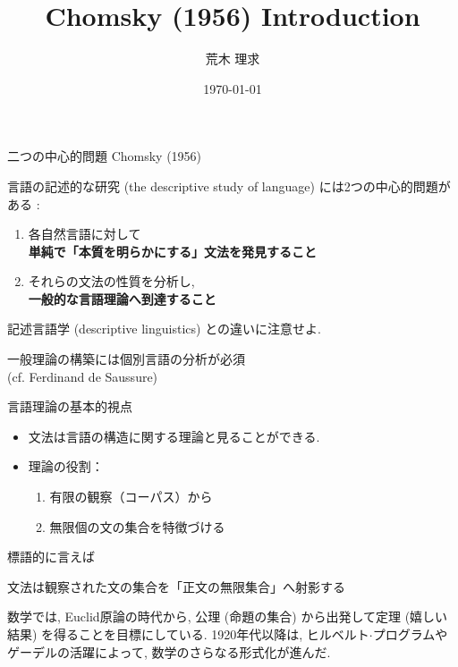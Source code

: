 \documentclass[dvipdfmx, xcolor={dvipsnames},12pt]{beamer}
\title{Chomsky (1956) Introduction }
\author{荒木 理求}
\date\today
\begin{document}
\frame{\titlepage}

\begin{frame}{二つの中心的問題}
Chomsky (1956)

言語の記述的な研究 (the descriptive study of language) には2つの中心的問題がある :

\begin{enumerate}
    \item 各自然言語に対して\\
    \quad \textbf{単純で「本質を明らかにする」文法を発見すること}
    
    \item それらの文法の性質を分析し,\\
    \quad \textbf{一般的な言語理論へ到達すること}
\end{enumerate}

\begin{marker}
記述言語学 (descriptive linguistics) との違いに注意せよ. 
\end{marker}

\begin{marker}
一般理論の構築には個別言語の分析が必須\\
(cf. Ferdinand de Saussure)
\end{marker}
\end{frame}

\begin{frame}{言語理論の基本的視点}
\begin{itemize}
    \item 文法は言語の構造に関する理論と見ることができる.
    \item 理論の役割：
    \begin{enumerate}
        \item 有限の観察（コーパス）から
        \item 無限個の文の集合を特徴づける
    \end{enumerate}
\end{itemize}
    標語的に言えば
    \begin{block}{}
        文法は観察された文の集合を「正文の無限集合」へ射影する
    \end{block}
\begin{marker}
数学では, Euclid原論の時代から, 公理 (命題の集合) から出発して定理 (嬉しい結果) を得ることを目標にしている. 1920年代以降は, ヒルベルト$\cdot$プログラムやゲーデルの活躍によって, 数学のさらなる形式化が進んだ.
\end{marker}
\end{frame}
\end{document}
